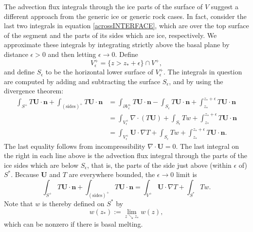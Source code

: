 \documentclass[12pt,final]{amsart}%
\theoremstyle{plain}
\theoremstyle{definition}
\theoremstyle{remark}
\newcommand{\diverg}{\nabla\cdot}
\newcommand{\Div}{\diverg}
\def\eps{\epsilon}
\newcommand{\grad}{\nabla}
\newcommand{\nhat}{\mathbf{n}}
\newcommand{\bU}{{\mathbf{U}}}
\begin{document}
The advection flux integrals through the ice parts of the surface of $V$ suggest a different approach from the generic ice or generic rock cases.  In fact, consider the last two integrals in equation \eqref{acrossINTERFACE}, which are over the top surface of the segment and the parts of its sides which are ice, respectively.  We approximate these integrals by integrating strictly above the basal plane by distance $\eps>0$  and then letting $\eps\to 0$.  Define
    $$V_\eps^+ = \{z > z_\ast+\eps\} \cap V^+,$$
and define $S_\eps$ to be the horizontal lower surface of $V_\eps^+$.  The integrals in question are computed by adding and subtracting the surface $S_\eps$, and by using the divergence theorem:
\begin{align*}
\int_{S^+} T \bU\cdot \nhat + \int_{(\text{sides})^+} T \bU\cdot \nhat &= \int_{\partial V_\eps^+} T \bU\cdot \nhat - \int_{S_\eps} T \bU\cdot \nhat + \int_{z_\ast}^{z_\ast+\eps} T \bU\cdot \nhat \\
    &= \int_{V_\eps^+} \Div\left(T\bU\right) + \int_{S_\eps} T w + \int_{z_\ast}^{z_\ast+\eps} T \bU\cdot \nhat \\
    &= \int_{V_\eps^+} \bU\cdot \grad T + \int_{S_\eps} T w + \int_{z_\ast}^{z_\ast+\eps} T \bU\cdot \nhat.
\end{align*}
The last equality follows from incompressibility $\Div\bU=0$.  The last integral on the right in each line above is the advection flux integral through the parts of the ice sides which are below $S_\eps$, that is, the parts of the side just above (within $\eps$ of) $S^\ast$.  Because $\bU$ and $T$ are everywhere bounded, the $\eps \to 0$ limit is
\begin{equation}\label{advectfluxINTERFACE}
\int_{S^+} T \bU\cdot \nhat + \int_{(\text{sides})^+} T \bU\cdot \nhat = \int_{V^+} \bU\cdot \grad T + \int_{S^\ast} T w.
\end{equation}
Note that $w$ is thereby defined on $S^\ast$ by
    $$w(z_\ast) := \lim_{z\searrow z_\ast} w(z),$$
which can be nonzero if there is basal melting.
\end{document}
